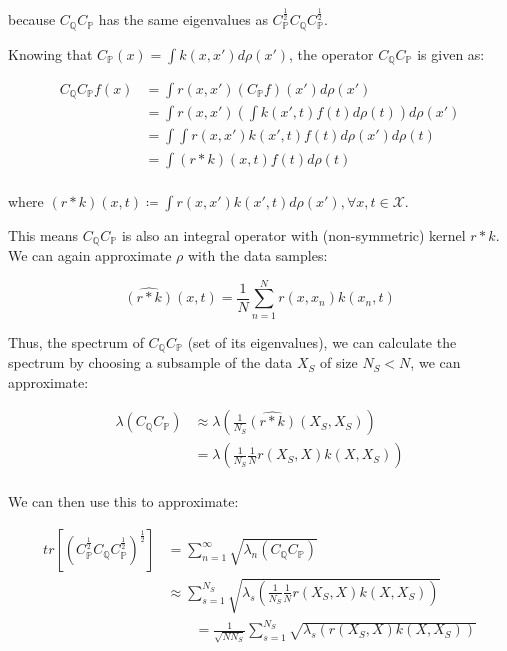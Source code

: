 \documentclass[twoside,11pt]{article}
\begin{document}
because $C_{\mathbb{Q}}C_{\mathbb{P}}$ has the same eigenvalues as $C_{\mathbb{P}}^{\frac{1}{2}}C_{\mathbb{Q}}C_{\mathbb{P}}^{\frac{1}{2}}$.

Knowing that $C_{\mathbb{P}}(x) = \int k(x, x') d\rho(x')$, the operator $C_{\mathbb{Q}}C_{\mathbb{P}}$  is given as:

\begin{align*}
C_{\mathbb{Q}}C_{\mathbb{P}}f(x) &= \int r(x, x')\left(C_{\mathbb{P}} f \right) (x') d\rho(x')\\
&= \int r(x, x')\left( \int k(x', t)f(t) d\rho(t) \right) d\rho(x')\\
&= \int \int r(x, x')  k(x', t)f(t) d\rho(x') d\rho(t)\\
&= \int (r * k)(x, t)  f(t) d\rho(t)\\
\end{align*}

where $(r * k)(x, t) \coloneqq \int r(x, x')  k(x', t) d\rho(x'), \forall x, t \in \mathcal{X}$.

This means $C_{\mathbb{Q}}C_{\mathbb{P}}$ is also an integral operator with (non-symmetric) kernel $r * k$.
We can again approximate $\rho$ with the data samples:

\[\widehat{(r * k)}(x, t) = \frac{1}{N} \sum_{n=1}^N r(x, x_n)  k(x_n, t)\]

Thus, the spectrum of $C_{\mathbb{Q}}C_{\mathbb{P}}$ (set of its eigenvalues), we can calculate the spectrum by choosing a subsample of the data $X_S$ of size $N_S < N$, we can approximate:

\begin{align*}
\lambda\left( C_{\mathbb{Q}}C_{\mathbb{P}}\right) &\approx \lambda\left(\frac{1}{N_S}\widehat{(r * k)}(X_S, X_S)\right)\\
&= \lambda\left(\frac{1}{N_S}\frac{1}{N} r(X_S, X)  k(X, X_S)\right)\\
\end{align*}

We can then use this to approximate:

\begin{align*}
tr \left[ \left( C_{\mathbb{P}}^{\frac{1}{2}}C_{\mathbb{Q}}C_{\mathbb{P}}^{\frac{1}{2}}\right)^{\frac{1}{2}}\right] &= \sum_{n=1}^{\infty} \sqrt {\lambda_n\left( C_{\mathbb{Q}}C_{\mathbb{P}}\right)}\\
&\approx \sum_{s=1}^{N_S} \sqrt {\lambda_s\left( \frac{1}{N_S}\frac{1}{N} r(X_S, X)  k(X, X_S)\right)}\\
&\qquad = \frac{1}{\sqrt{N N_S}} \sum_{s=1}^{N_S} \sqrt {\lambda_s\left(  r(X_S, X)  k(X, X_S)\right)}\\
\end{align*}
\end{document}
